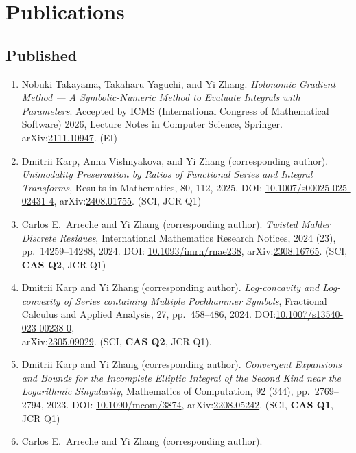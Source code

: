 \documentclass[a4paper,12pt]{article}
\begin{document}
\section*{\Large{Publications}}

\subsection*{Published}
\begin{enumerate}
\item Nobuki Takayama, Takaharu Yaguchi, and Yi Zhang. {\em Holonomic Gradient Method --- A Symbolic-Numeric Method to Evaluate Integrals with Parameters}.  Accepted by ICMS (International Congress of Mathematical Software) 2026, Lecture Notes in Computer Science, Springer.  arXiv:\href{https://arxiv.org/abs/2111.10947}{2111.10947}. (EI)
\item  Dmitrii Karp, Anna Vishnyakova, and Yi Zhang (corresponding author). {\em Unimodality Preservation by Ratios of Functional Series and Integral Transforms}, Results in Mathematics, 80, 112, 2025. DOI: \href{https://doi.org/10.1007/s00025-025-02431-4}{10.1007/s00025-025-02431-4}, arXiv:\href{https://arxiv.org/abs/2408.01755}{2408.01755}. (SCI, JCR Q1)
\item  Carlos E.\ Arreche and Yi Zhang (corresponding author). {\em Twisted Mahler Discrete Residues}, International Mathematics Research Notices, 2024 (23), pp.\  14259--14288, 2024. 
DOI: \href{https://doi.org/10.1093/imrn/rnae238}{10.1093/imrn/rnae238}, arXiv:\href{https://arxiv.org/abs/2308.16765}{2308.16765}. (SCI, \textbf{CAS Q2}, JCR Q1)
\item Dmitrii Karp and Yi Zhang (corresponding author). {\em Log-concavity and Log-convexity of Series containing Multiple Pochhammer Symbols},  Fractional Calculus and Applied Analysis, 27, pp.\ 458--486, 2024. DOI:\href{https://doi.org/10.1007/s13540-023-00238-0}{10.1007/s13540-023-00238-0}, \\ arXiv:\href{https://arxiv.org/abs/2305.09029}{2305.09029}.  (SCI, \textbf{CAS Q2}, JCR Q1). 
\item Dmitrii Karp and Yi Zhang (corresponding author). {\em Convergent Expansions and Bounds for the Incomplete Elliptic Integral of the Second Kind near the Logarithmic Singularity},  Mathematics of Computation, 92 (344), pp.\ 2769--2794, 2023. DOI: \href{https://doi.org/10.1090/mcom/3874}{10.1090/mcom/3874}, arXiv:\href{https://arxiv.org/abs/2208.05242}{2208.05242}. (SCI, \textbf{CAS Q1}, JCR Q1)
\item Carlos E.\ Arreche and Yi Zhang (corresponding author). 

\end{enumerate}
\end{document}
